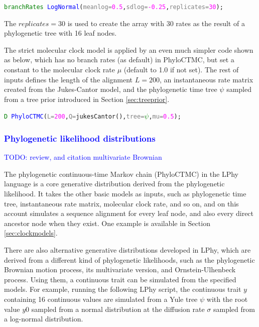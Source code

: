 \documentclass[10pt,letterpaper,table]{article}
\begin{document}
{{\small
\begin{alltt}
  \textcolor{green}{branchRates} ~ \textcolor{blue}{LogNormal}(\textcolor{gray}{meanlog=}\textcolor{magenta}{0.5}, \textcolor{gray}{sdlog=}\textcolor{magenta}{-0.25}, \textcolor{gray}{replicates=}\textcolor{magenta}{30});
\end{alltt}
}

The $replicates=30$ is used to create the array with 30 rates as the result of a phylogenetic tree with 16 leaf nodes.

The strict molecular clock model is applied by an even much simpler code shown as below, which has no branch rates (as default) in PhyloCTMC, but set a constant to the molecular clock rate $\mu$ (default to 1.0 if not set). 
The rest of inputs defines the length of the alignment $L=200$, an instantaneous rate matrix created from the Jukes-Cantor model, and the phylogenetic time tree $\psi$ sampled from a tree prior introduced in Section \ref{sec:treeprior}.

{\small
\begin{alltt}
  \textcolor{green}{D} ~ \textcolor{blue}{PhyloCTMC}(\textcolor{gray}{L=}\textcolor{magenta}{200}, \textcolor{gray}{Q=}\textcolor{magenta!80!black}{jukesCantor}(), \textcolor{gray}{tree=}\textcolor{green}{\(\psi\)}, \textcolor{gray}{mu=}\textcolor{magenta}{0.5});
\end{alltt}
}


\textcolor{blue}{\subsubsection{Phylogenetic likelihood distributions}}

\textcolor{blue}{TODO: review, and citation multivariate Brownian}

The phylogenetic continuous-time Markov chain (PhyloCTMC) \cite{felsenstein1981} in the LPhy language is a core generative distribution derived from the phylogenetic likelihood. It takes the other basic models as inputs, such as phylogenetic time tree, instantaneous rate matrix, molecular clock rate, and so on, and on this account simulates a sequence alignment for every leaf node, and also every direct ancestor node when they exist. One example is available in Section \ref{sec:clockmodels}.

There are also alternative generative distributions developed in LPhy, which are derived from a different kind of phylogenetic likelihoods, such as the phylogenetic Brownian motion process\cite{felsenstein1973maximum}, its multivariate version\cite{}, and Ornstein-Ulhenbeck process\cite{felsenstein1973maximum}. Using them, a continuous trait can be simulated from the specified models.
For example, running the following LPhy script, the continuous trait $y$ containing 16 continuous values are simulated from a Yule tree $\psi$ with the root value $y0$ sampled from a normal distribution at the diffusion rate $\sigma$ sampled from a log-normal distribution.

}
\end{document}
